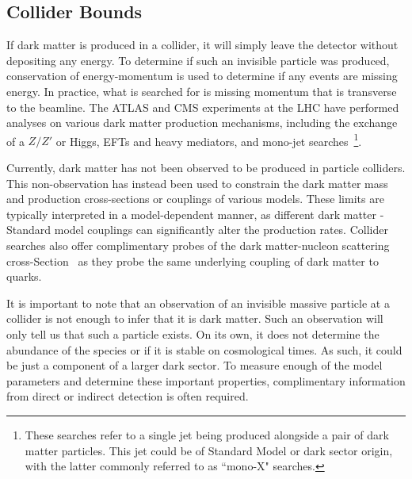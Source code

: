 \subsection{Collider Bounds}

If dark matter is produced in a collider, it will simply leave the detector without depositing any energy. To determine if such an invisible particle was produced, conservation of energy-momentum is used to determine if any events are missing energy. In practice, what is searched for is missing momentum that is transverse to the beamline.
The ATLAS and CMS experiments at the LHC have performed analyses on various dark matter production mechanisms, including the exchange of a $Z/Z'$ or Higgs, EFTs and heavy mediators, and mono-jet searches~\cite{CMS:2017jdm_jul_Searchdarkmatter}\footnote{These searches refer to a single jet being produced alongside a pair of dark matter particles. This jet could be of Standard Model or dark sector origin, with the latter commonly referred to as ``mono-X" searches.}. 

Currently, dark matter has not been observed to be produced in particle colliders. This non-observation has instead been used to constrain the dark matter mass and production cross-sections or couplings of various models. 
These limits are typically interpreted in a model-dependent manner, as different dark matter - Standard model couplings can significantly alter the production rates. Collider searches also offer complimentary probes of the dark matter-nucleon scattering cross-Section~\cite{Ruppin:2014bra_oct_Complementaritydarkmatter} as they probe the same underlying coupling of dark matter to quarks.  

 
 It is important to note that an observation of an invisible massive particle at a collider is not enough to infer that it is dark matter. Such an observation will only tell us that such a particle exists. On its own, it does not determine the abundance of the species or if it is stable on cosmological times. As such, it could be just a component of a larger dark sector. To measure enough of the model parameters and determine these important properties, complimentary information from direct or indirect detection is often required. 
 
